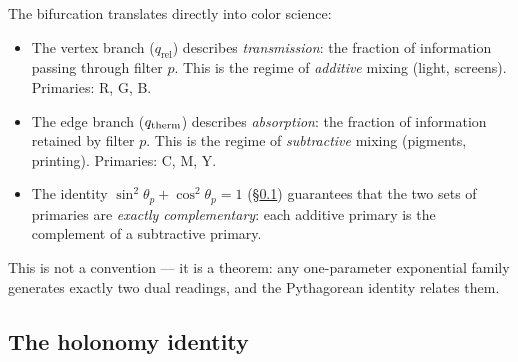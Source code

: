\documentclass[12pt,a4paper]{article}
\providecommand{\qrel}{\ensuremath{q_{\mathrm{rel}}}}
\begin{document}
\begin{remark}
The bifurcation translates directly into color science:
\begin{itemize}[nosep]
\item The vertex branch ($\qrel$) describes \emph{transmission}:
  the fraction of information passing through filter $p$. This is the
  regime of \emph{additive} mixing (light, screens).
  Primaries: R, G, B.
\item The edge branch ($q_{\mathrm{therm}}$) describes \emph{absorption}:
  the fraction of information retained by filter $p$. This is the
  regime of \emph{subtractive} mixing (pigments, printing).
  Primaries: C, M, Y.
\item The identity $\sin^2\!\theta_p + \cos^2\!\theta_p = 1$
  (\S\ref{app:holonomy}) guarantees that the two sets of primaries are
  \emph{exactly complementary}: each additive primary is the
  complement of a subtractive primary.
\end{itemize}
This is not a convention --- it is a theorem: any one-parameter
exponential family generates exactly two dual readings, and the
Pythagorean identity relates them.
\end{remark}

\subsection{The holonomy identity}
\label{app:holonomy}
\end{document}
